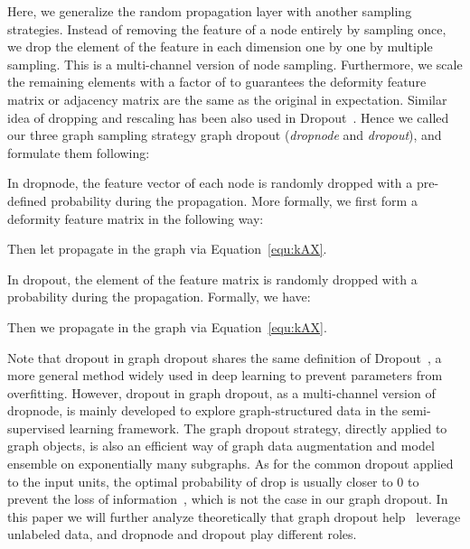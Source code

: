 {{Here, we generalize the random propagation layer with another sampling strategies. Instead of removing the feature of a node entirely by sampling once, we drop the element of the feature in each dimension one by one by multiple sampling. This is a multi-channel version of node sampling. Furthermore, we scale the remaining elements with a factor of  to 
 guarantees the deformity feature matrix or adjacency matrix are the same as the original in expectation. Similar idea of dropping and rescaling has been also used in Dropout~\cite{srivastava2014dropout}. Hence we called our three graph sampling strategy graph dropout (\textit{dropnode} and \textit{dropout}), and formulate them following:
 
 In dropnode, the feature vector of each node is randomly dropped with a pre-defined probability  during the propagation. More formally, we first form a deformity feature matrix  in the following way:

Then let  propagate in the graph via Equation~\ref{equ:kAX}. 

 In dropout, the element of the feature matrix is randomly dropped with a probability  during the propagation. Formally, we have:

Then we  propagate  in the graph via Equation~\ref{equ:kAX}. 



Note that dropout in graph dropout shares the same definition of Dropout~\cite{srivastava2014dropout}, a more general method widely used in deep learning to prevent parameters from overfitting. However, dropout in graph dropout, as a multi-channel version of dropnode, is mainly developed to explore graph-structured data in the semi-supervised learning framework. The graph dropout strategy, directly applied to graph objects, is also an efficient way of graph data augmentation and  model ensemble on exponentially many subgraphs. As for the common dropout applied to the input units, the optimal probability of drop is usually closer to 0 to prevent the loss of information~\cite{srivastava2014dropout}, which is not the case in our graph dropout. In this paper we will further analyze theoretically that graph dropout help \model\ leverage unlabeled data, and dropnode and dropout play different roles. 
}



}

